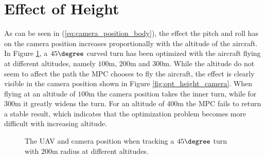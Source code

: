 \section{Effect of Height}

As can be seen in (\ref{eq:camera_position_body}), the effect the pitch and roll has on the camera position increases proportionally with the altitude of the aircraft. In Figure \ref{fig:opt_height}, a $45\degree$ curved turn has been optimized with the aircraft flying at different altitudes, namely $100$m, $200$m and $300$m. While the altitude do not seem to affect the path the MPC chooses to fly the aircraft, the effect is clearly visible in the camera position shown in Figure \ref{fig:opt_height_camera}. When flying at an altitude of $100$m the camera position takes the inner turn, while for $300$m it greatly widens the turn. For an altitude of $400$m the MPC fails to return a stable result, which indicates that the optimization problem becomes more difficult with increasing altitude.

\begin{figure}
	\caption{The UAV and camera position when tracking a $45\degree$ turn with $200$m radius at different altitudes.}
	\label{fig:opt_height}
\end{figure}